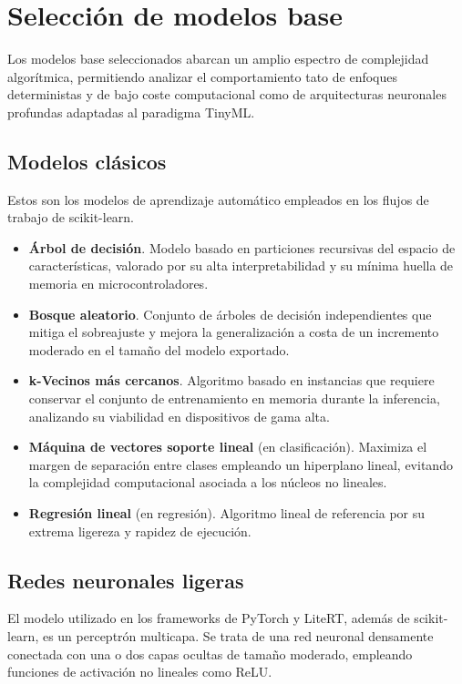 \documentclass[a4paper,12pt,twoside,final]{book}
\begin{document}
\section{Selección de modelos base}
Los modelos base seleccionados abarcan un amplio espectro de complejidad algorítmica, permitiendo analizar el
comportamiento tato de enfoques deterministas y de bajo coste computacional como de arquitecturas neuronales
profundas adaptadas al paradigma TinyML.

\subsection{Modelos clásicos}
Estos son los modelos de aprendizaje automático empleados en los flujos de trabajo de scikit-learn.
\begin{itemize}
  \item \textbf{Árbol de decisión}. Modelo basado en particiones recursivas del espacio de características, valorado
  por su alta interpretabilidad y su mínima huella de memoria en microcontroladores.
  \item \textbf{Bosque aleatorio}. Conjunto de árboles de decisión independientes que mitiga el sobreajuste y mejora la
  generalización a costa de un incremento moderado en el tamaño del modelo exportado.
  \item \textbf{k-Vecinos más cercanos}. Algoritmo basado en instancias que requiere conservar el conjunto de
  entrenamiento en memoria durante la inferencia, analizando su viabilidad en dispositivos de gama alta.
  \item \textbf{Máquina de vectores soporte lineal} (en clasificación). Maximiza el margen de separación entre clases
  empleando un hiperplano lineal, evitando la complejidad computacional asociada a los núcleos no lineales.
  \item \textbf{Regresión lineal} (en regresión). Algoritmo lineal de referencia por su extrema ligereza y rapidez de
  ejecución.
\end{itemize}

\subsection{Redes neuronales ligeras}
El modelo utilizado en los frameworks de PyTorch y LiteRT, además de scikit-learn, es un perceptrón multicapa. Se
trata de una red neuronal densamente conectada con una o dos capas ocultas de tamaño moderado, empleando funciones
de activación no lineales como ReLU.
\end{document}
